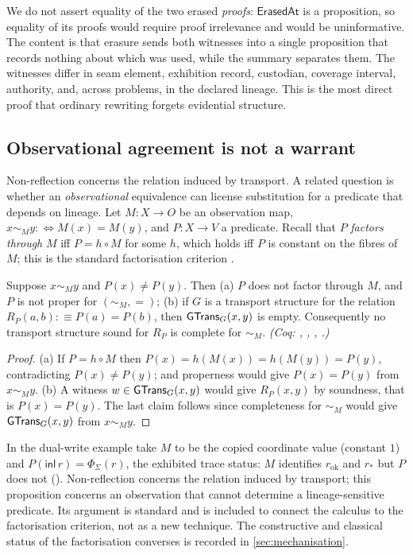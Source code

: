 We do not assert equality of the two erased \emph{proofs}: $\mathsf{ErasedAt}$ is a proposition, so equality of its proofs would require proof irrelevance and would be uninformative. The content is that erasure sends both witnesses into a single proposition that records nothing about which was used, while the summary separates them. The witnesses differ in seam element, exhibition record, custodian, coverage interval, authority, and, across problems, in the declared lineage. This is the most direct proof that ordinary rewriting forgets evidential structure.

\subsection{Observational agreement is not a warrant}\label{sec:obstruction}
Non-reflection concerns the relation induced by transport. A related question is whether an \emph{observational} equivalence can license substitution for a predicate that depends on lineage. Let $M : X \to O$ be an observation map, $x \sim_M y :\Leftrightarrow M(x) = M(y)$, and $P : X \to V$ a predicate. Recall that $P$ \emph{factors through} $M$ iff $P = h \circ M$ for some $h$, which holds iff $P$ is constant on the fibres of $M$; this is the standard factorisation criterion \cite{cousot1977}.
\begin{prop}\label{prop:obsobstruction}
Suppose $x \sim_M y$ and $P(x) \neq P(y)$. Then
(a) $P$ does not factor through $M$, and $P$ is not proper for $(\sim_M, =)$;
(b) if $G$ is a transport structure for the relation $R_P(a,b) :\equiv P(a) = P(b)$, then $\mathsf{GTrans}_G(x,y)$ is empty.
Consequently no transport structure sound for $R_P$ is complete for $\sim_M$. \emph{(Coq: , , , .)}
\end{prop}
\begin{proof}
(a) If $P = h \circ M$ then $P(x) = h(M(x)) = h(M(y)) = P(y)$, contradicting $P(x) \neq P(y)$; and properness would give $P(x) = P(y)$ from $x \sim_M y$. (b) A witness $w \in \mathsf{GTrans}_G(x,y)$ would give $R_P(x,y)$ by soundness, that is $P(x) = P(y)$. The last claim follows since completeness for $\sim_M$ would give $\mathsf{GTrans}_G(x,y)$ from $x \sim_M y$.
\end{proof}
In the dual-write example take $M$ to be the copied coordinate value (constant $1$) and $P(\mathsf{inl}\,r) = \Phi_\Sigma(r)$, the exhibited trace status: $M$ identifies $r_{\mathrm{ok}}$ and $r_*$ but $P$ does not (). Non-reflection concerns the relation induced by transport; this proposition concerns an observation that cannot determine a lineage-sensitive predicate. Its argument is standard and is included to connect the calculus to the factorisation criterion, not as a new technique. The constructive and classical status of the factorisation converses is recorded in \cref{sec:mechanisation}.
